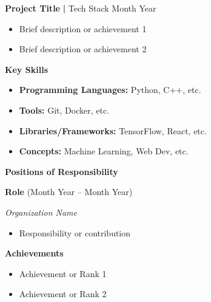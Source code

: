 \documentclass{article}
\begin{document}
\large {\bf Project Title} {\href{https://github.com/link-to-project}{\faGithub}}\textbf{|} Tech Stack \hspace*{\fill} {Month Year} \par
\vspace{-2mm}
\normalsize\begin{itemize}[noitemsep]
  \item Brief description or achievement 1
  \item Brief description or achievement 2
\end{itemize}

\vspace{1mm}
\medskip
\Large {\bf Key Skills} \hrulefill \par
\vspace{-1mm}
\normalsize\begin{itemize}[noitemsep]
  \item {\bf Programming Languages:} Python, C++, etc.
  \item {\bf Tools:} Git, Docker, etc.
  \item {\bf Libraries/Frameworks:} TensorFlow, React, etc.
  \item {\bf Concepts:} Machine Learning, Web Dev, etc.
\end{itemize}

\vspace{1mm}
\medskip
\Large {\bf Positions of Responsibility} \hrulefill \par
\vspace{1mm}
\large {\bf Role} \hspace*{\fill} {(Month Year – Month Year)} \par
\normalsize {\it Organization Name} \par
\vspace{-2mm}
\begin{itemize}[noitemsep]
  \item Responsibility or contribution
\end{itemize}

\vspace{1mm}
\medskip
\Large {\bf Achievements} \hrulefill \par
\vspace{-1mm}
\begin{itemize}[noitemsep]
  \item Achievement or Rank 1
  \item Achievement or Rank 2
\end{itemize}
\end{document}
